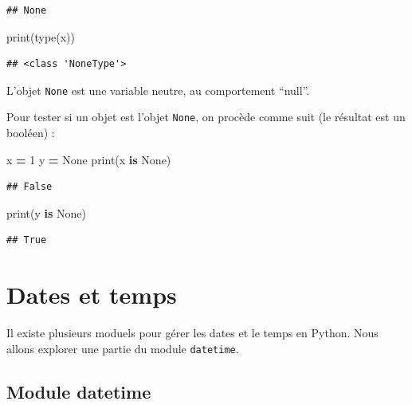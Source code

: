 \documentclass[12pt,]{book}
\newenvironment{Shaded}{\begin{snugshade}}{\end{snugshade}}
\newcommand{\KeywordTok}[1]{\textcolor[rgb]{0.13,0.29,0.53}{\textbf{#1}}}
\newcommand{\DecValTok}[1]{\textcolor[rgb]{0.00,0.00,0.81}{#1}}
\newcommand{\VariableTok}[1]{\textcolor[rgb]{0.00,0.00,0.00}{#1}}
\newcommand{\OperatorTok}[1]{\textcolor[rgb]{0.81,0.36,0.00}{\textbf{#1}}}
\newcommand{\BuiltInTok}[1]{#1}
\newcommand{\NormalTok}[1]{#1}
\numberwithin{equation}{section}
\numberwithin{countremarque}{section}
\begin{document}
\begin{lstlisting}
## None
\end{lstlisting}

\begin{Shaded}
\begin{Highlighting}[]
\BuiltInTok{print}\NormalTok{(}\BuiltInTok{type}\NormalTok{(x))}
\end{Highlighting}
\end{Shaded}

\begin{lstlisting}
## <class 'NoneType'>
\end{lstlisting}

L'objet \texttt{None} est une variable neutre, au comportement ``null''.

Pour tester si un objet est l'objet \texttt{None}, on procède comme suit
(le résultat est un booléen) :

\begin{Shaded}
\begin{Highlighting}[]
\NormalTok{x }\OperatorTok{=} \DecValTok{1}
\NormalTok{y }\OperatorTok{=} \VariableTok{None}
\BuiltInTok{print}\NormalTok{(x }\KeywordTok{is} \VariableTok{None}\NormalTok{)}
\end{Highlighting}
\end{Shaded}

\begin{lstlisting}
## False
\end{lstlisting}

\begin{Shaded}
\begin{Highlighting}[]
\BuiltInTok{print}\NormalTok{(y }\KeywordTok{is} \VariableTok{None}\NormalTok{)}
\end{Highlighting}
\end{Shaded}

\begin{lstlisting}
## True
\end{lstlisting}

\section{Dates et temps}\label{dates-et-temps}

Il existe plusieurs moduels pour gérer les dates et le temps en Python.
Nous allons explorer une partie du module \texttt{datetime}.

\subsection{Module datetime}\label{module-datetime}
\end{document}
